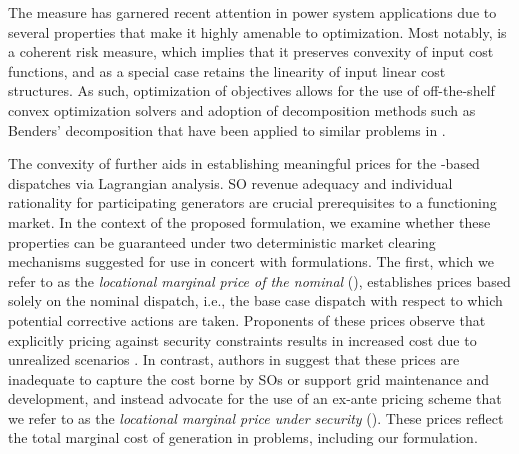 The \CVaR{} measure has garnered recent attention in power system applications \cite{jabr2005robust,asensio2015stochastic,madavan2019risk,li2018flexible,wang2015distributionally} due to several properties that make it highly amenable to optimization. Most notably, 
\CVaR{} is a coherent risk measure, which implies that it preserves convexity \cite{shapiro2021lectures} of input cost functions, and as a special case retains the linearity of input linear cost structures. 
As such, optimization of \CVaR{} objectives allows for the use of off-the-shelf convex optimization solvers and adoption of decomposition methods such as Benders' decomposition that have been applied to similar problems in \cite{liu2015computational}.

The convexity of \CVaR{} further aids in establishing meaningful prices for the \RSCED{}-based dispatches via Lagrangian analysis. SO revenue adequacy and individual rationality for participating generators are crucial prerequisites to a functioning market. In the context of the proposed \RSCED{} formulation, we examine whether these properties can be guaranteed under two deterministic market clearing mechanisms suggested for use in concert with \SCED{} formulations. The first,
which we refer to as the \emph{locational marginal price of the nominal} (\LMPnom{}), establishes prices based solely on the nominal dispatch, i.e., the base case dispatch with respect to which potential corrective actions are taken. Proponents of these prices observe that explicitly pricing against security constraints results in increased cost due to unrealized scenarios \cite{boucher1998security}. In contrast, authors in \cite{hogan2014electricity} suggest that these prices are inadequate to capture the cost borne by SOs or support grid maintenance and development, and instead advocate for the use of an ex-ante pricing scheme that we refer to as the \emph{locational marginal price under security} (\LMPmar{}). These prices reflect the total marginal cost of generation in \CSCED{} problems, including our \RSCED{} formulation.

